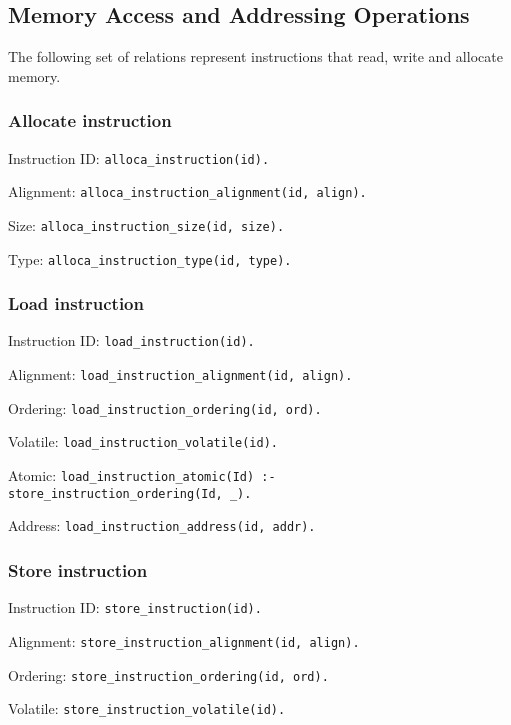 \subsection{Memory Access and Addressing Operations}
The following set of relations represent instructions that read, write and allocate memory.


\subsubsection{Allocate instruction} 
\noindent Instruction ID:
\texttt{alloca\_instruction(id).}

\noindent Alignment:
\texttt{alloca\_instruction\_alignment(id, align).}

\noindent Size:
\texttt{alloca\_instruction\_size(id, size).}

\noindent Type:
\texttt{alloca\_instruction\_type(id, type).}

 

\subsubsection{Load instruction}
Instruction ID:
\texttt{load\_instruction(id).}

\noindent Alignment:
\texttt{load\_instruction\_alignment(id, align).}

\noindent Ordering:
\texttt{load\_instruction\_ordering(id, ord).}

\noindent Volatile:
\texttt{load\_instruction\_volatile(id).}

\noindent Atomic:
\texttt{load\_instruction\_atomic(Id) :- \\
        \tab store\_instruction\_ordering(Id, \_).}

\noindent Address:
\texttt{load\_instruction\_address(id, addr).}


\subsubsection{Store instruction}
Instruction ID:
\texttt{store\_instruction(id).}

\noindent Alignment:
\texttt{store\_instruction\_alignment(id, align).}

\noindent Ordering:
\texttt{store\_instruction\_ordering(id, ord).}

\noindent Volatile:
\texttt{store\_instruction\_volatile(id).}

